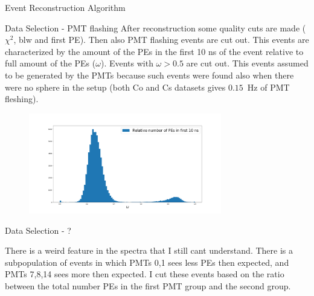\documentclass{beamer}
\begin{document}
\begin{frame}{Event Reconstruction Algorithm}

\end{frame}

\begin{frame}{Data Selection - PMT flashing}
After reconstruction some quality cuts are made ($\chi^2$, blw and first PE). Then also PMT flashing events are cut out. This events are characterized by the amount of the PEs in the first 10 ns of the event relative to full amount of the PEs ($\omega$). Events with $\omega>0.5$ are cut out. This events assumed to be generated by the PMTs because such events were found also when there were no sphere in the setup (both Co and Cs datasets gives $0.15$~Hz of PMT fleshing). 
\begin{figure}[h]
    \centering
    \includegraphics[width=0.75\textwidth]{w.png}
\end{figure}
\end{frame}

\begin{frame}{Data Selection - ?}
\begin{figure}
\qquad
\end{figure}
There is a weird feature in the spectra that I still cant understand. There is a subpopulation of events in which PMTs 0,1 sees less PEs then expected, and PMTs 7,8,14 sees more then expected. I cut these events based on the ratio between the total number PEs in the first PMT group and the second group. 
\end{frame}
\end{document}
